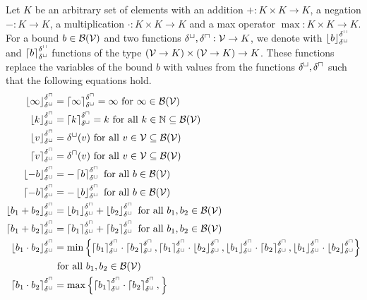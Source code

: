 \begin{definition}
  \allowdisplaybreaks
  Let $K$ be an arbitrary set of elements with an addition $+: K \times K \rightarrow K$, a negation $-: K \rightarrow K$, a multiplication $\cdot: K \times K \rightarrow K$ and a max operator $\max: K \times K \rightarrow K$.
  For a bound $b \in \BoundSet(\VSet)$ and two functions $\lsub, \usub: \VSet \rightarrow K$, we denote with $\lsubst{b}{\lsub}{\usub}$ and $\usubst{b}{\lsub}{\usub}$ functions of the type $(\VSet \rightarrow K) \times (\VSet \rightarrow K) \rightarrow K$.
  These functions replace the variables of the bound $b$ with values from the functions $\lsub, \usub$ such that the following equations hold.
  \begin{align*}
    \lsubst{\infty}{\lsub}{\usub} &= \usubst{\infty}{\lsub}{\usub} = \infty \text{ for } \infty \in \BoundSet(\VSet) \\
    \lsubst{k}{\lsub}{\usub} &= \usubst{k}{\lsub}{\usub} = k \text{ for all } k \in \mathbb{N} \subseteq \BoundSet(\VSet) \\
    \lsubst{v}{\lsub}{\usub} &= \lsub(v) \text{ for all } v \in \VSet \subseteq \BoundSet(\VSet) \\
    \usubst{v}{\lsub}{\usub} &= \usub(v) \text{ for all } v \in \VSet \subseteq \BoundSet(\VSet) \\
    \lsubst{-b}{\lsub}{\usub} &= -\usubst{b}{\lsub}{\usub} \text{ for all } b \in \BoundSet(\VSet) \\
    \usubst{-b}{\lsub}{\usub} &= -\lsubst{b}{\lsub}{\usub} \text{ for all } b \in \BoundSet(\VSet) \\
    \lsubst{b_1 + b_2}{\lsub}{\usub} &= \lsubst{b_1}{\lsub}{\usub} + \lsubst{b_2}{\lsub}{\usub} \text{ for all } b_1, b_2 \in \BoundSet(\VSet) \\
    \usubst{b_1 + b_2}{\lsub}{\usub} &= \usubst{b_1}{\lsub}{\usub} + \usubst{b_2}{\lsub}{\usub} \text{ for all } b_1, b_2 \in \BoundSet(\VSet) \\
    \lsubst{b_1 \cdot b_2}{\lsub}{\usub} &= \minimum{
      \usubst{b_1}{\lsub}{\usub} \cdot \usubst{b_2}{\lsub}{\usub},
      \usubst{b_1}{\lsub}{\usub} \cdot \lsubst{b_2}{\lsub}{\usub},
      \lsubst{b_1}{\lsub}{\usub} \cdot \usubst{b_2}{\lsub}{\usub},
      \lsubst{b_1}{\lsub}{\usub} \cdot \lsubst{b_2}{\lsub}{\usub}
    } \\ & \text{ for all } b_1, b_2 \in \BoundSet(\VSet) \\
    \usubst{b_1 \cdot b_2}{\lsub}{\usub} &= \maximum{
      \usubst{b_1}{\lsub}{\usub} \cdot \usubst{b_2}{\lsub}{\usub},
}
\end{align*}
\end{definition}
